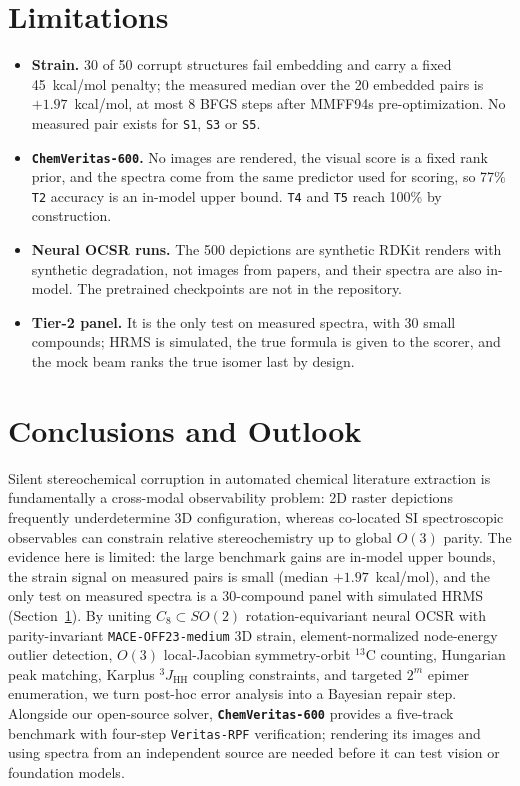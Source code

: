 \documentclass[10pt,twocolumn]{article}
\begin{document}
\section{Limitations}
\label{sec:limits}
\begin{itemize}
  \item \textbf{Strain.} 30 of 50 corrupt structures fail embedding and carry a fixed 45~kcal/mol penalty; the measured median over the 20 embedded pairs is $+1.97$~kcal/mol, at most 8 BFGS steps after MMFF94s pre-optimization. No measured pair exists for \texttt{S1}, \texttt{S3} or \texttt{S5}.
  \item \textbf{\texttt{ChemVeritas-600}.} No images are rendered, the visual score is a fixed rank prior, and the spectra come from the same predictor used for scoring, so 77\% \texttt{T2} accuracy is an in-model upper bound. \texttt{T4} and \texttt{T5} reach 100\% by construction.
  \item \textbf{Neural OCSR runs.} The 500 depictions are synthetic RDKit renders with synthetic degradation, not images from papers, and their spectra are also in-model. The pretrained checkpoints are not in the repository.
  \item \textbf{Tier-2 panel.} It is the only test on measured spectra, with 30 small compounds; HRMS is simulated, the true formula is given to the scorer, and the mock beam ranks the true isomer last by design.
\end{itemize}

\section{Conclusions and Outlook}
\label{sec:conclusion}

Silent stereochemical corruption in automated chemical literature extraction is fundamentally a cross-modal observability problem: 2D raster depictions frequently underdetermine 3D configuration, whereas co-located SI spectroscopic observables can constrain relative stereochemistry up to global $O(3)$ parity. The evidence here is limited: the large benchmark gains are in-model upper bounds, the strain signal on measured pairs is small (median $+1.97$~kcal/mol), and the only test on measured spectra is a 30-compound panel with simulated HRMS (Section~\ref{sec:limits}). By uniting $C_8 \subset SO(2)$ rotation-equivariant neural OCSR with parity-invariant \texttt{MACE-OFF23-medium} 3D strain, element-normalized node-energy outlier detection, $O(3)$ local-Jacobian symmetry-orbit $^{13}\text{C}$ counting, Hungarian peak matching, Karplus $^3J_{\text{HH}}$ coupling constraints, and targeted $2^m$ epimer enumeration, we turn post-hoc error analysis into a Bayesian repair step. Alongside our open-source solver, \textbf{\texttt{ChemVeritas-600}} provides a five-track benchmark with four-step \texttt{Veritas-RPF} verification; rendering its images and using spectra from an independent source are needed before it can test vision or foundation models.
\end{document}
